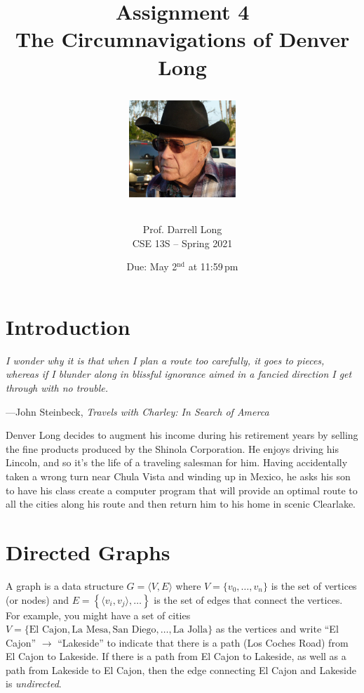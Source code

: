 \documentclass[11pt]{article}
\title{Assignment 4 \\ The Circumnavigations of Denver Long \\ \bigskip
\centerline{\includegraphics[width=0.3\textwidth]{images/dl.jpg}}}
\author{Prof. Darrell Long \\ CSE 13S -- Spring 2021}
\date{Due: May 2$^\text{nd}$ at 11:59\,pm}
\begin{document}
\maketitle

\section{Introduction}

\textwidth
\epigraph{\emph{I wonder why it is that when I plan a route too
    carefully, it goes to pieces, whereas if I blunder along in blissful
    ignorance aimed in a fancied direction I get through with no
    trouble.}}{---John Steinbeck, \emph{Travels with Charley: In Search
    of Amerca}}

Denver Long decides to augment his income during his retirement
years by selling the fine products produced by the Shinola Corporation.
He enjoys driving his Lincoln, and so it's the life of a traveling
salesman for him. Having accidentally taken a wrong turn near Chula
Vista and winding up in Mexico, he asks his son to have his class create
a computer program that will provide an optimal route to all the cities
along his route and then return him to his home in scenic Clearlake.

\section{Directed Graphs}

A graph is a data structure $G = \langle V, E \rangle$ where $V = \{
v_0, \ldots, v_n \}$ is the set of vertices (or nodes) and $E = \left \{
\langle v_i,v_j \rangle, \ldots \right \}$ is the set of edges that connect the
vertices. For example, you might have a set of cities $V = \{ \text{El
Cajon}, \text{La Mesa}, \text{San Diego}, \ldots, \text{La Jolla} \}$ as
the vertices and write ``El Cajon'' $\rightarrow$ ``Lakeside'' to
indicate that there is a path (Los Coches Road) from El Cajon to
Lakeside. If there is a path from El Cajon to Lakeside, as well as a
path from Lakeside to El Cajon, then the edge connecting El Cajon and
Lakeside is \emph{undirected}.
\end{document}
